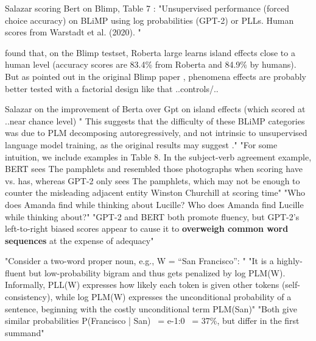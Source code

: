 Salazar scoring Bert on Blimp, Table 7 \citep{salazar2020masked}: "Unsupervised performance (forced choice accuracy) on BLiMP using log probabilities (GPT-2) or PLLs. Human scores from Warstadt et al. (2020). " \citep{salazar2020masked}

\citet{salazar2020masked} found that, on the Blimp testset, Roberta large learns island effects close to a human level (accuracy scores are 83.4\% from Roberta and 84.9\% by humans). But as pointed out in the original Blimp paper \citep{warstadt2020blimp}, phenomena effects are probably better tested with a factorial design like \citep{wilcox2018rnn} that ..controls/.. 

Salazar on the improvement of Berta over Gpt on island effects (which \citep{warstadt2020blimp} scored at ..near chance level) " This
suggests that the difficulty of these BLiMP categories was due to PLM decomposing autoregressively, and not intrinsic to unsupervised language
model training, as the original results may suggest
\citep{warstadt2020blimp}." \citep{salazar2020masked}
"For some intuition, we include examples in Table 8. In the subject-verb
agreement example, BERT sees The pamphlets and resembled those photographs when scoring have vs. has, whereas GPT-2 only sees The pamphlets, which may not be enough to counter the misleading adjacent entity Winston Churchill at scoring time" \citep{salazar2020masked}
"Who does Amanda find while thinking about Lucille?
Who does Amanda find Lucille while thinking about?"
"GPT-2 and BERT both promote fluency, but GPT-2’s left-to-right biased
scores appear to cause it to \textbf{overweigh common word sequences} at the expense of adequacy" \citep{salazar2020masked}

"Consider a two-word proper noun, e.g., W = “San Francisco”: " "It is a highly-fluent but low-probability bigram and thus gets penalized by log PLM(W). Informally, PLL(W) expresses how likely each token is given other tokens (self-consistency), while log PLM(W) expresses the unconditional probability of a sentence, beginning with the costly unconditional term PLM(San)" "Both give similar probabilities P(Francisco | San) ~= e-1:0 ~= 37\%, but differ in the first summand"  \citep{salazar2020masked}

